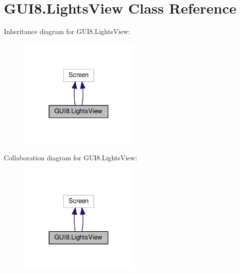 \hypertarget{classGUI8_1_1LightsView}{}\section{G\+U\+I8.\+Lights\+View Class Reference}
\label{classGUI8_1_1LightsView}


Inheritance diagram for G\+U\+I8.\+Lights\+View\+:\nopagebreak
\begin{figure}[H]
\begin{center}
\leavevmode
\includegraphics[width=171pt]{classGUI8_1_1LightsView__inherit__graph}
\end{center}
\end{figure}


Collaboration diagram for G\+U\+I8.\+Lights\+View\+:\nopagebreak
\begin{figure}[H]
\begin{center}
\leavevmode
\includegraphics[width=171pt]{classGUI8_1_1LightsView__coll__graph}
\end{center}
\end{figure}
